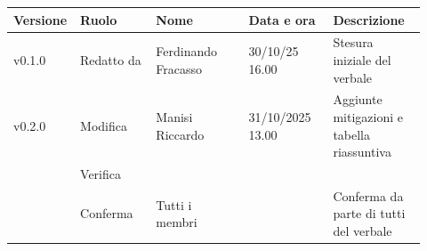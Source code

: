 \documentclass[a4paper,12pt]{article}
\begin{document}
\begin{center}
\small
\renewcommand{\arraystretch}{1.2} 
\begin{tabular}{|p{0.1\linewidth}|p{0.18\linewidth}|p{0.22\linewidth}|p{0.20\linewidth}|p{0.22\linewidth}|}
\hline
\rowcolor{gray!60} 
\textbf{Versione} & \textbf{Ruolo} & \textbf{Nome} & \textbf{Data e ora} & \textbf{Descrizione} \\
\hline
\rowcolor{white}
v0.1.0 & Redatto da & Ferdinando Fracasso & 30/10/25 16.00 & Stesura iniziale del verbale \\
\hline
\rowcolor{gray!20}
v0.2.0 & Modifica & Manisi Riccardo & 31/10/2025 13.00 & Aggiunte mitigazioni e tabella riassuntiva \\
\hline
\rowcolor{white}
 & Verifica &  &  &  \\
\hline
\rowcolor{gray!20}
 & Conferma & Tutti i membri &  & Conferma da parte di tutti del verbale \\
\hline
\end{tabular}
\end{center}
\end{document}
